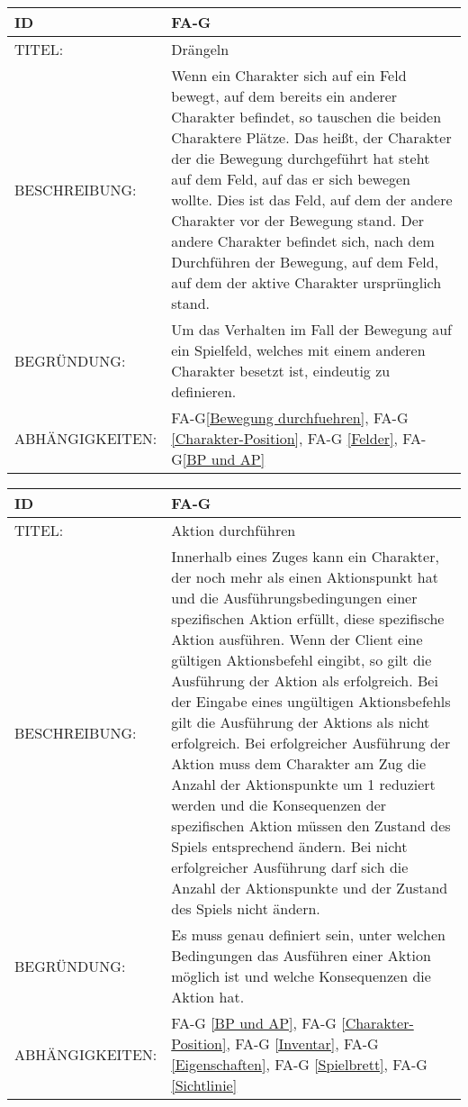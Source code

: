 \begin{tabularx}{16cm}{l|X}
	{table}\label{Draengeln}
	\textbf{ID} & \textbf{FA-G\arabic{table}} \\
	\hline
	TITEL: & Drängeln \\
	\hline
	BESCHREIBUNG: & Wenn ein Charakter sich auf ein Feld bewegt, auf dem bereits ein anderer Charakter 		befindet, so tauschen die beiden Charaktere Plätze. Das heißt, der Charakter der die Bewegung durchgeführt hat steht auf dem Feld, auf das er sich bewegen wollte. Dies ist das Feld, auf dem der andere Charakter vor der Bewegung stand. Der andere Charakter befindet sich, nach dem Durchführen der Bewegung, auf dem Feld, auf dem der aktive Charakter ursprünglich stand. \\
	\hline
	BEGRÜNDUNG: & Um das Verhalten im Fall der Bewegung auf ein Spielfeld, welches mit einem anderen 			Charakter besetzt ist, eindeutig zu definieren.\\
	\hline
	ABHÄNGIGKEITEN: & FA-G\ref{Bewegung durchfuehren}, FA-G \ref{Charakter-Position}, FA-G \ref{Felder}, FA-G\ref{BP und AP} \\
\end{tabularx}

\begin{tabularx}{16cm}{l|X}
	{table}\label{Aktion durchfuehren}
	\textbf{ID} & \textbf{FA-G\arabic{table}} \\
	\hline
	TITEL: & Aktion durchführen \\
	\hline
	BESCHREIBUNG: & Innerhalb eines Zuges kann ein Charakter, der noch mehr als einen Aktionspunkt hat und die Ausführungsbedingungen einer spezifischen Aktion erfüllt, diese spezifische Aktion ausführen.
	 Wenn der Client eine gültigen Aktionsbefehl eingibt, so gilt die Ausführung der Aktion als erfolgreich. Bei der Eingabe eines ungültigen Aktionsbefehls gilt die Ausführung der Aktions als nicht erfolgreich. 
	 Bei erfolgreicher Ausführung der Aktion muss dem Charakter am Zug die Anzahl der Aktionspunkte um 1 reduziert werden und die Konsequenzen der spezifischen Aktion müssen den Zustand des Spiels entsprechend ändern. Bei nicht erfolgreicher Ausführung darf sich die Anzahl der Aktionspunkte und der Zustand des Spiels nicht ändern. \\
	\hline
	BEGRÜNDUNG: & Es muss genau definiert sein, unter welchen Bedingungen das Ausführen einer Aktion möglich ist und welche Konsequenzen die Aktion hat.\\
	\hline
	ABHÄNGIGKEITEN: & FA-G \ref{BP und AP}, FA-G \ref{Charakter-Position}, FA-G \ref{Inventar}, FA-G \ref{Eigenschaften}, FA-G \ref{Spielbrett}, FA-G \ref{Sichtlinie} \\
\end{tabularx}


